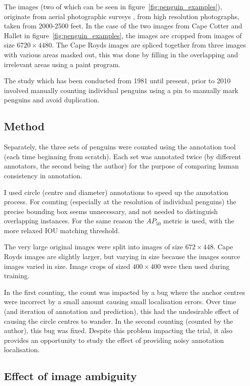 The images (two of which can be seen in figure~\ref{fig:penguin_examples}), originate from aerial photographic surveys \cite{Lyver2014}, from high resolution photographs, taken from 2000-2500 feet. In the case of the two images from Cape Cotter and Hallet in figure~\ref{fig:penguin_examples}, the images are cropped from images of size $ 6720\times4480 $. The Cape Royds images are spliced together from three images with various areas masked out, this was done by filling in the overlapping and irrelevant areas using a paint program.

The study which has been conducted from 1981 until present, prior to 2010 involved manually counting individual penguins using a pin to manually mark penguins and avoid duplication. 


\subsection {Method}

Separately, the three sets of penguins were counted using the annotation tool (each time beginning from scratch). Each set was annotated twice (by different annotators, the second being the author) for the purpose  of comparing human consistency in annotation.

I used circle (centre and diameter) annotations to speed up the annotation process. For counting (especially at the resolution of individual penguins) the precise bounding box seems unnecessary, and not needed to distinguish overlapping instances. For the same reason the $AP_{50}$ metric is used, with the more relaxed \gls{IOU} matching threshold.

The very large original images were split into images of size $ 672\times448 $. Cape Royds images are slightly larger, but varying in size because the images source images varied in size. Image crops of sized $ 400\times400 $ were then used during training.

In the first counting, the count was impacted by a bug where the anchor centres were incorrect by a small amount causing small localisation errors. Over time (and iteration of annotation and prediction), this had the undesirable effect of causing the circle centres to wander. In the second counting (counted by the author), this bug was fixed. Despite this problem impacting the trial, it also provides an opportunity to study the effect of providing noisy annotation localisation.

\subsection {Effect of image ambiguity}

